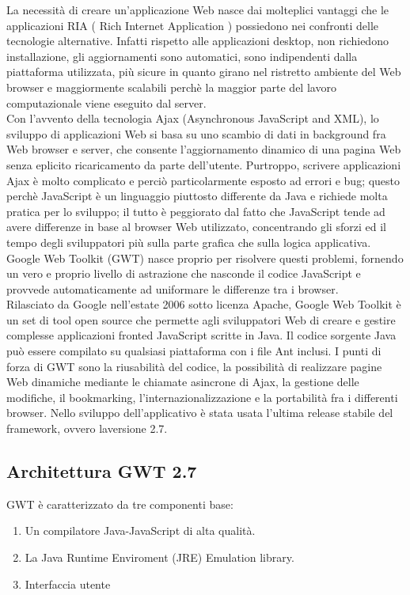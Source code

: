 La necessit\`a di creare un'applicazione Web nasce dai molteplici vantaggi che le applicazioni RIA ( Rich Internet Application ) possiedono nei confronti delle tecnologie alternative. Infatti rispetto alle applicazioni desktop, non richiedono installazione, gli aggiornamenti sono automatici, sono indipendenti dalla piattaforma utilizzata, pi\`u sicure in quanto girano nel ristretto ambiente del Web browser e maggiormente scalabili perch\`e la maggior parte del lavoro computazionale viene eseguito dal server.\\
Con l'avvento della tecnologia Ajax (Asynchronous JavaScript and XML), lo sviluppo di applicazioni Web si basa su uno scambio di dati in background fra Web browser e server, che
consente l'aggiornamento dinamico di una pagina Web senza eplicito ricaricamento da parte dell'utente. Purtroppo, scrivere applicazioni Ajax \`e molto complicato e perci\`o particolarmente esposto ad errori e bug; questo perch\`e JavaScript \`e un linguaggio piuttosto differente da Java e richiede molta pratica per lo sviluppo; il tutto \`e peggiorato dal fatto che JavaScript tende ad avere differenze in base al browser Web utilizzato, concentrando gli sforzi ed il tempo degli sviluppatori pi\`u sulla parte grafica che sulla logica applicativa. Google Web Toolkit (GWT) nasce proprio per risolvere questi problemi, fornendo un vero e proprio livello di astrazione che nasconde il codice JavaScript e provvede automaticamente ad uniformare le differenze tra i browser. \\
Rilasciato da Google nell'estate 2006 sotto licenza Apache, Google Web Toolkit \`e un set di tool open source che permette agli sviluppatori Web di creare e gestire complesse applicazioni fronted JavaScript scritte in Java. Il codice sorgente Java pu\`o essere compilato su qualsiasi piattaforma con i file Ant inclusi. I punti di forza di GWT sono la riusabilit\`a del codice, la possibilit\`a di realizzare pagine Web dinamiche mediante le chiamate asincrone di Ajax, la gestione delle modifiche, il bookmarking, l'internazionalizzazione e la portabilit\`a fra i differenti browser. 
Nello sviluppo dell'applicativo è stata usata l'ultima release stabile del framework, ovvero laversione 2.7.
\subsection{Architettura GWT 2.7}
GWT \`e caratterizzato da tre componenti base:
\begin{enumerate}
\item Un compilatore Java-JavaScript di alta qualit\`a.
\item La Java Runtime Enviroment (JRE) Emulation library.
\item Interfaccia utente
\end{enumerate}
